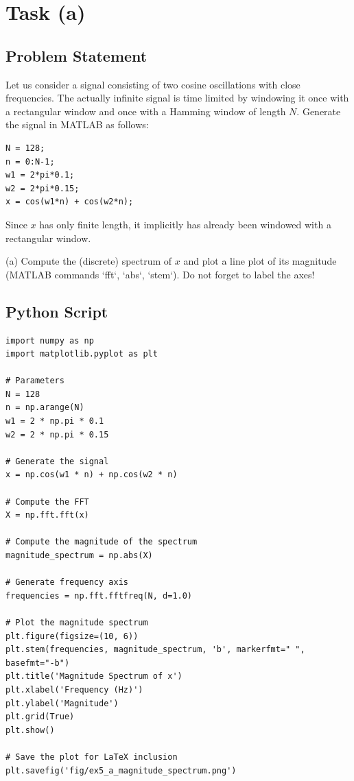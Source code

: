 \item[(a)]
\section*{Task (a)}

\subsection*{Problem Statement}
Let us consider a signal consisting of two cosine oscillations with close frequencies. The actually infinite signal is time limited by windowing it once with a rectangular window and once with a Hamming window of length \( N \). Generate the signal in MATLAB as follows:

\begin{verbatim}
N = 128;
n = 0:N-1;
w1 = 2*pi*0.1;
w2 = 2*pi*0.15;
x = cos(w1*n) + cos(w2*n);
\end{verbatim}

Since \( x \) has only finite length, it implicitly has already been windowed with a rectangular window.

(a) Compute the (discrete) spectrum of \( x \) and plot a line plot of its magnitude (MATLAB commands `fft`, `abs`, `stem`). Do not forget to label the axes!

\subsection*{Python Script}
\begin{verbatim}
import numpy as np
import matplotlib.pyplot as plt

# Parameters
N = 128
n = np.arange(N)
w1 = 2 * np.pi * 0.1
w2 = 2 * np.pi * 0.15

# Generate the signal
x = np.cos(w1 * n) + np.cos(w2 * n)

# Compute the FFT
X = np.fft.fft(x)

# Compute the magnitude of the spectrum
magnitude_spectrum = np.abs(X)

# Generate frequency axis
frequencies = np.fft.fftfreq(N, d=1.0)

# Plot the magnitude spectrum
plt.figure(figsize=(10, 6))
plt.stem(frequencies, magnitude_spectrum, 'b', markerfmt=" ", basefmt="-b")
plt.title('Magnitude Spectrum of x')
plt.xlabel('Frequency (Hz)')
plt.ylabel('Magnitude')
plt.grid(True)
plt.show()

# Save the plot for LaTeX inclusion
plt.savefig('fig/ex5_a_magnitude_spectrum.png')
\end{verbatim}

